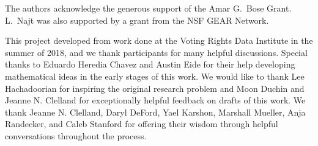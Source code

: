
 The authors acknowledge the generous support of the Amar G.\ Bose Grant. L.\ Najt was also supported by a grant from the NSF GEAR Network.

This project developed from work done at the Voting Rights Data Institute in the summer of 2018, and we thank participants for many helpful discussions. Special thanks to Eduardo Heredia Chavez and Austin Eide for their help developing mathematical ideas in the early stages of this work. We would like to thank Lee Hachadoorian for inspiring the original research problem and Moon Duchin and Jeanne N. Clelland for exceptionally helpful feedback on drafts of this work.  We thank Jeanne N. Clelland, Daryl DeFord, Yael Karshon, Marshall Mueller, Anja Randecker, and Caleb Stanford for offering their wisdom through helpful conversations throughout the process.
